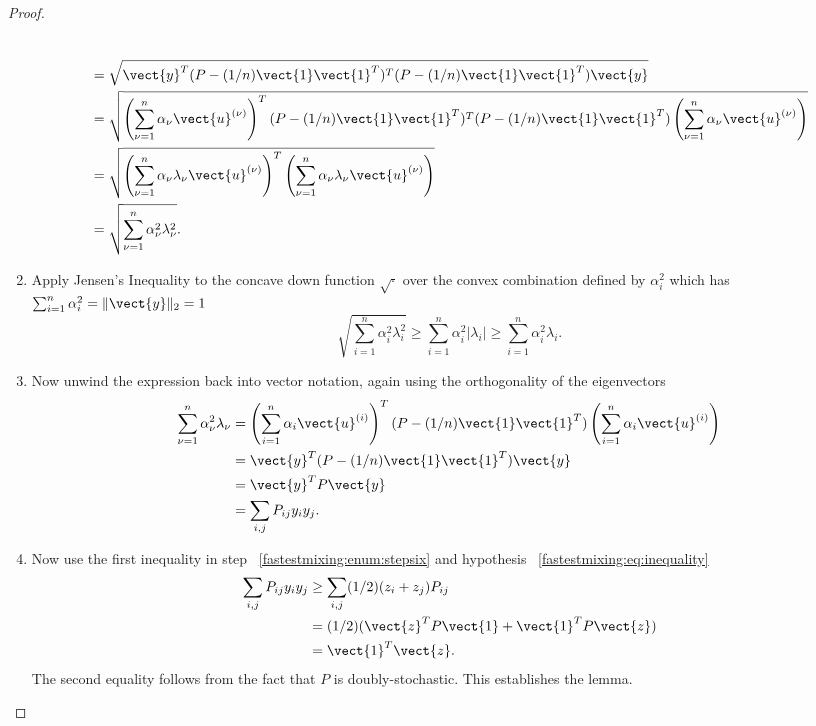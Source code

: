 \documentclass[12pt]{article}
\begin{document}
\begin{proof}
\begin{enumerate}
\begin{align*}
                \\
                &\quad = \sqrt{\vect{y}^T (P - (1/n)\vect{1}\vect{1}^T)^T
                (P - (1/n)\vect {1}\vect{1}^T) \vect{y} } \\
                &\quad = \sqrt{\left( \sum_{\nu=1}^n \alpha_\nu \vect{u}^
                {(\nu)} \right)^T (P - (1/n)\vect{1}\vect{1}^T)^T (P - (1/n)\vect
                {1}\vect {1}^T) \left( \sum_{\nu=1}^n \alpha_\nu \vect{u}^
                {(\nu)} \right)} \\
                &\quad = \sqrt{\left( \sum_{\nu=1}^n \alpha_\nu \lambda_\nu
                \vect{u}^ {(\nu)} \right)^T \left( \sum_{\nu=1}^n \alpha_\nu
                \lambda_\nu \vect{u}^ {(\nu)} \right)} \\
                &\quad = \sqrt{\sum_{\nu=1}^n \alpha_\nu^2 \lambda_\nu^2}.
            \end{align*}
        \item
            Apply Jensen's Inequality to the concave down function \(
            \sqrt{\cdot} \) over the convex combination defined by \(
            \alpha_i^2 \) which has \( \sum_{i=1}^n \alpha_i^2 = \|
            \vect{y} \|_2 = 1 \)
            \[
                \sqrt{\sum_{i=1}^n \alpha_i^2 \lambda_i^2} \ge \sum_{i=1}^n
                \alpha_i^2 | \lambda_i | \ge \sum_{i=1}^n \alpha_i^2
                \lambda_i.
            \]
        \item
            Now unwind the expression back into vector notation, again
            using the orthogonality of the eigenvectors
            \begin{align*}
                \sum_{\nu=1}^n \alpha_\nu^2 \lambda_\nu &= \left( \sum_{i=1}^n
                \alpha_i \vect{u}^{(i)} \right)^T (P - (1/n)\vect {1}\vect
                {1}^T) \left( \sum_{i=1}^n \alpha_i \vect{u}^{(i)}
                \right) \\
                &= \vect{y}^T (P - (1/n)\vect{1}\vect{1}^T) \vect{y} \\
                &= \vect{y}^T P \vect{y} \\
                &= \sum_{i,j} P_{ij} y_i y_j.
            \end{align*}
        \item
            Now use the first inequality in step~%
            \ref{fastestmixing:enum:stepsix} and hypothesis~%
            \eqref{fastestmixing:eq:inequality}
            \begin{align*}
                \sum_{i,j} P_{ij} y_i y_j &\ge \sum_{i,j}(1/2)(z_i + z_j)P_
                {ij} \\
                &= (1/2) (\vect{z}^T P \vect{1} + \vect{1}^T P \vect{z}
                ) \\
                &= \vect{1}^T \vect{z}.
            \end{align*}
            The second equality follows from the fact that \( P \) is
            doubly-stochastic.  This establishes the lemma.
    \end{enumerate}
\end{proof}
\end{document}
